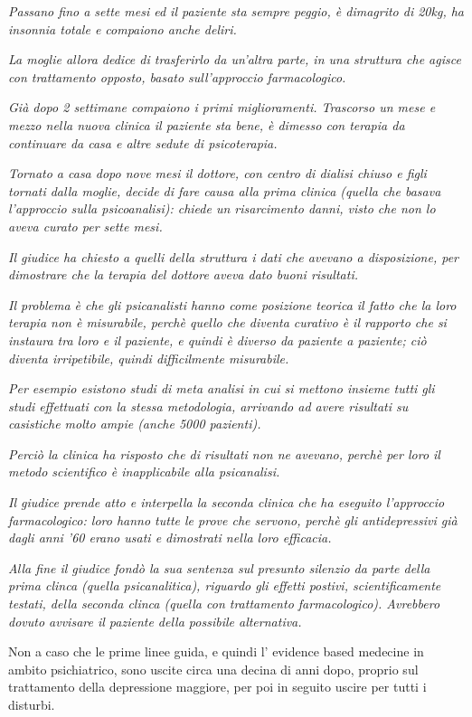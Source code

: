 \emph{Passano fino a sette mesi ed il paziente sta sempre peggio, è
dimagrito di 20kg, ha insonnia totale e compaiono anche deliri.}

\emph{La moglie allora dedice di trasferirlo da un'altra parte, in una
struttura che agisce con trattamento opposto, basato sull'approccio
farmacologico.}

\emph{Già dopo 2 settimane compaiono i primi miglioramenti. Trascorso un
mese e mezzo nella nuova clinica il paziente sta bene, è dimesso con
terapia da continuare da casa e altre sedute di psicoterapia.}

\emph{Tornato a casa dopo nove mesi il dottore, con centro di dialisi
chiuso e figli tornati dalla moglie, decide di fare causa alla prima
clinica (quella che basava l'approccio sulla psicoanalisi): chiede un
risarcimento danni, visto che non lo aveva curato per sette mesi.}

\emph{Il giudice ha chiesto a quelli della struttura i dati che avevano
a disposizione, per dimostrare che la terapia del dottore aveva dato
buoni risultati.}

\emph{Il problema è che gli psicanalisti hanno come posizione teorica il
fatto che la loro terapia non è misurabile, perchè quello che diventa
curativo è il rapporto che si instaura tra loro e il paziente, e quindi
è diverso da paziente a paziente; ciò diventa irripetibile, quindi
difficilmente misurabile.}

\emph{Per esempio esistono studi di meta analisi in cui si mettono
insieme tutti gli studi effettuati con la stessa metodologia, arrivando
ad avere risultati su casistiche molto ampie (anche 5000 pazienti).}

\emph{Perciò la clinica ha risposto che di risultati non ne avevano,
perchè per loro il metodo scientifico è inapplicabile alla psicanalisi.}

\emph{Il giudice prende atto e interpella la seconda clinica che ha
eseguito l'approccio farmacologico: loro hanno tutte le prove che
servono, perchè gli antidepressivi già dagli anni '60 erano usati e
dimostrati nella loro efficacia.}

\emph{Alla fine il giudice fondò la sua sentenza sul presunto silenzio
da parte della prima clinca (quella psicanalitica), riguardo gli effetti
postivi, scientificamente testati, della seconda clinca (quella con
trattamento farmacologico). Avrebbero dovuto avvisare il paziente della
possibile alternativa.}

Non a caso che le prime linee guida, e quindi l' evidence based medecine
in ambito psichiatrico, sono uscite circa una decina di anni dopo,
proprio sul trattamento della depressione maggiore, per poi in seguito
uscire per tutti i disturbi.

